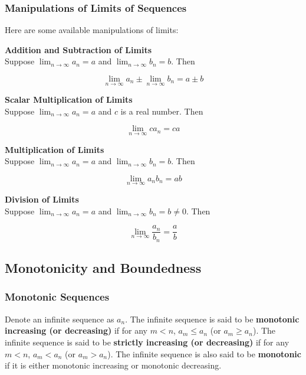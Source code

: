 \documentclass[a4paper,12pt]{article}
\begin{document}
\subsubsection{Manipulations of Limits of Sequences}
\begin{pst}
  Here are some available manipulations of limits:

  \begin{alist}
    \item \textbf{Addition and Subtraction of Limits}\\
    Suppose $\lim_{n\to\infty}a_{n}=a$ and $\lim_{n\to\infty}b_{n}=b$. Then

    $$\lim_{n\to \infty}a_{n}\pm\lim_{n\to \infty}b_{n}=a\pm b$$

    \item \textbf{Scalar Multiplication of Limits}\\
    Suppose $\lim_{n\to\infty}a_{n}=a$ and $c$ is a real number. Then

    $$\lim_{n\to\infty}ca_{n}=ca$$

    \item \textbf{Multiplication of Limits}\\
    Suppose $\lim_{n\to\infty}a_{n}=a$ and $\lim_{n\to\infty}b_{n}=b$. Then

    $$\lim_{n\to\infty}a_{n}b_{n}=ab$$

    \item \textbf{Division of Limits}\\
    Suppose $\lim_{n\to\infty}a_{n}=a$ and $\lim_{n\to\infty}b_{n}=b\neq 0$. Then

    $$\lim_{n\to\infty}\frac{a_{n}}{b_{n}}=\frac{a}{b}$$
  \end{alist}
\end{pst}

\subsection{Monotonicity and Boundedness}
\subsubsection{Monotonic Sequences}
\begin{dft}
  Denote an infinite sequence as $a_{n}$. The infinite sequence is said to be \textbf{monotonic increasing (or decreasing)} if for any $m<n$, $a_{m}\leq a_{n}$ (or $a_{m}\geq a_{n}$). The infinite sequence is said to be \textbf{strictly increasing (or decreasing)} if for any $m<n$, $a_{m}<a_{n}$ (or $a_{m}>a_{n}$). The infinite sequence is also said to be \textbf{monotonic} if it is either monotonic increasing or monotonic decreasing.
\end{dft}
\end{document}
